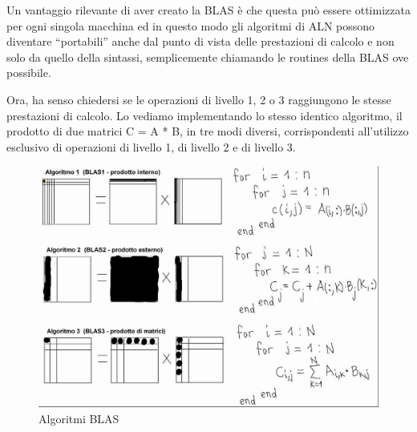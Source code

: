 Un vantaggio rilevante di aver creato la BLAS è che questa può essere ottimizzata per ogni singola macchina ed in questo modo gli algoritmi di ALN possono diventare ``portabili'' anche dal punto di vista delle prestazioni di calcolo e non solo da quello della sintassi, semplicemente chiamando le routines della BLAS ove possibile.

Ora, ha senso chiedersi se le operazioni di livello 1, 2 o 3 raggiungono le stesse prestazioni di calcolo. Lo vediamo implementando lo stesso identico algoritmo, il prodotto di due matrici C = A * B, in tre modi diversi, corrispondenti all'utilizzo esclusivo di operazioni di livello 1, di livello 2 e di livello 3.

\begin{figure}[ht!]
\centering
\includegraphics[width=130mm]{images/implementazioni_prodotto_di_matrici.jpg}
\caption{Algoritmi BLAS}
\label{overflow}
\end{figure}